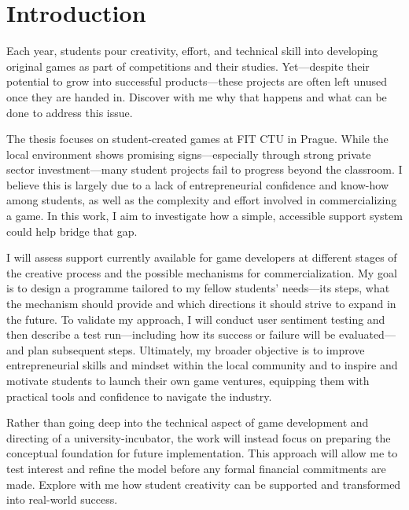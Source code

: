 \chapter*{Introduction}
Each year, students pour creativity, effort, and technical skill into developing original games as part of competitions and their studies. Yet—despite their potential to grow into successful products—these projects are often left unused once they are handed in. Discover with me why that happens and what can be done to address this issue.

The thesis focuses on student-created games at FIT CTU in Prague. While the local environment shows promising signs—especially through strong private sector investment—many student projects fail to progress beyond the classroom. I believe this is largely due to a lack of entrepreneurial confidence and know-how among students, as well as the complexity and effort involved in commercializing a game. In this work, I aim to investigate how a simple, accessible support system could help bridge that gap.

I will assess support currently available for game developers at different stages of the creative process and the possible mechanisms for commercialization. My goal is to design a programme tailored to my fellow students’ needs—its steps, what the mechanism should provide and which directions it should strive to expand in the future. To validate my approach, I will conduct user sentiment testing and then describe a test run—including how its success or failure will be evaluated—and plan subsequent steps. Ultimately, my broader objective is to improve entrepreneurial skills and mindset within the local community and to inspire and motivate students to launch their own game ventures, equipping them with practical tools and confidence to navigate the industry.

Rather than going deep into the technical aspect of game development and directing of a university-incubator, the work will instead focus on preparing the conceptual foundation for future implementation. This approach will allow me to test interest and refine the model before any formal financial commitments are made. Explore with me how student creativity can be supported and transformed into real-world success.
